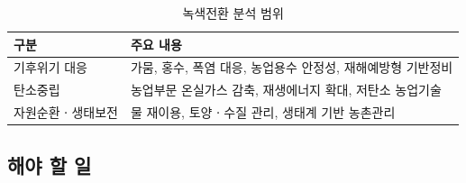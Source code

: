 \documentclass[11pt,a4paper]{article}
\begin{document}
\begin{table}[h]
\centering
\renewcommand{\arraystretch}{1.3}
\begin{tabular}{p{4cm} p{10cm}}
\toprule
\rowcolor{gray!20}
구분 & 주요 내용 \\
\midrule
기후위기 대응 & 가뭄, 홍수, 폭염 대응, 농업용수 안정성, 재해예방형 기반정비 \\
탄소중립 & 농업부문 온실가스 감축, 재생에너지 확대, 저탄소 농업기술 \\
자원순환ㆍ생태보전 & 물 재이용, 토양ㆍ수질 관리, 생태계 기반 농촌관리 \\
\bottomrule
\end{tabular}
\caption{녹색전환 분석 범위}
\end{table}

\subsection*{해야 할 일}
\end{document}
